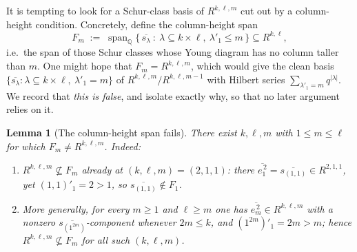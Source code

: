 \documentclass{amsart}
\newtheorem{lemma}{Lemma}
\theoremstyle{definition}
\newcommand{\Q}{\mathbb{Q}}
\newcommand{\rkl}{R^{k,\ell}}
\newcommand{\Rklm}{R^{k,\ell,m}}
\begin{document}
It is tempting to look for a Schur-class basis of $\Rklm$ cut out by a column-height
condition. Concretely, define the column-height span
\[
F_m \;:=\; \operatorname{span}_{\Q}\bigl\{\,\overline{s_\lambda}\ :\
\lambda\subseteq k\times\ell,\ \lambda'_1\le m\,\bigr\}\subseteq\rkl ,
\]
i.e.\ the span of those Schur classes whose Young diagram has no column taller than
$m$. One might hope that $F_m=\Rklm$, which would give the clean basis
$\{\overline{s_\lambda}:\lambda\subseteq k\times\ell,\ \lambda'_1=m\}$ of
$\Rklm/R^{k,\ell,m-1}$ with Hilbert series $\sum_{\lambda'_1=m}q^{|\lambda|}$. We
record that \emph{this is false}, and isolate exactly why, so that no later argument
relies on it.

\begin{lemma}[The column-height span fails]\label{lem:Fmfails}
There exist $k,\ell,m$ with $1\le m\le\ell$ for which $F_m\neq\Rklm$. Indeed:
\begin{enumerate}
\item[(i)] $\Rklm\not\subseteq F_m$ already at $(k,\ell,m)=(2,1,1)$: there
$\overline{e_1^{\,2}}=\overline{s_{(1,1)}}\in R^{2,1,1}$, yet $(1,1)'_1=2>1$, so
$\overline{s_{(1,1)}}\notin F_1$.
\item[(ii)] More generally, for every $m\ge1$ and $\ell\ge m$ one has
$\overline{e_m^{\,2}}\in\Rklm$ with a nonzero $\overline{s_{(1^{2m})}}$-component
whenever $2m\le k$, and $(1^{2m})'_1=2m>m$; hence $\Rklm\not\subseteq F_m$ for all
such $(k,\ell,m)$.
\end{enumerate}
\end{lemma}
\end{document}
